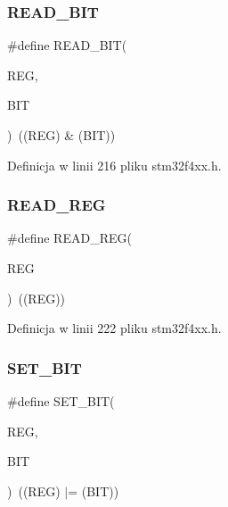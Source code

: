 \subsubsection{\texorpdfstring{R\+E\+A\+D\+\_\+\+B\+IT}{READ\_BIT}}
{\footnotesize\ttfamily \#define R\+E\+A\+D\+\_\+\+B\+IT(\begin{DoxyParamCaption}\item[{}]{R\+EG,  }\item[{}]{B\+IT }\end{DoxyParamCaption})~((R\+EG) \& (B\+IT))}



Definicja w linii 216 pliku stm32f4xx.\+h.

\mbox{\label{group___exported__macro_gae7f188a4d26c9e713a48414783421071}} 
\subsubsection{\texorpdfstring{R\+E\+A\+D\+\_\+\+R\+EG}{READ\_REG}}
{\footnotesize\ttfamily \#define R\+E\+A\+D\+\_\+\+R\+EG(\begin{DoxyParamCaption}\item[{}]{R\+EG }\end{DoxyParamCaption})~((R\+EG))}



Definicja w linii 222 pliku stm32f4xx.\+h.

\mbox{\label{group___exported__macro_ga26474f43799fbade9cf300e21dd3a91a}} 
\subsubsection{\texorpdfstring{S\+E\+T\+\_\+\+B\+IT}{SET\_BIT}}
{\footnotesize\ttfamily \#define S\+E\+T\+\_\+\+B\+IT(\begin{DoxyParamCaption}\item[{}]{R\+EG,  }\item[{}]{B\+IT }\end{DoxyParamCaption})~((R\+EG) $\vert$= (B\+IT))}



